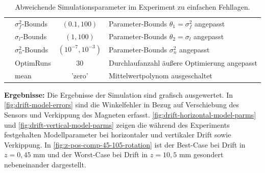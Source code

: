 \begin{table}[htp]
{\begin{tabular}{l l c l}
			                         & $\sigma_f^2$-Bounds & $(0.1, 100)$                 & Parameter-Bounds $\theta_1 = \sigma_f^2$ angepasst \\
			                         & $\sigma_l$-Bounds   & $(1, 100)$                   & Parameter-Bounds $\theta_2 = \sigma_l$ angepasst   \\
			                         & $\sigma_n^2$-Bounds & $(10^{-7}, 10^{-3})$         & Parameter-Bounds $\sigma_n^2$ angepasst            \\
			                         & OptimRuns           & $30$                         & Durchlaufanzahl äußere Optimierung angepasst       \\
			                         & mean                & 'zero'                       & Mittelwertpolynom ausgeschaltet                    \\ \bottomrule
		\end{tabular}}
	\caption{Abweichende Simulationsparameter im Experiment zu einfachen Fehllagen.}
	\label{tab:params-exp5}
\end{table}


\textbf{Ergebnisse:} Die Ergebnisse der Simulation sind grafisch ausgewertet. In \autoref{fig:drift-model-errors} sind die Winkelfehler in Bezug auf Verschiebung des Sensors und Verkippung des Magneten erfasst.
\autoref{fig:drift-horizontal-model-parms} und \autoref{fig:drift-vertical-model-parms} zeigen die während des Experiments festgehalten Modellparameter bei horizontaler und vertikaler Drift sowie Verkippung. In \autoref{fig:z-pos-comp-45-105-rotation} ist der Best-Case bei Drift in $z = 0,45$ mm und der Worst-Case bei Drift in $z = 10,5$ mm gesondert nebeneinander dargestellt.


\clearpage


